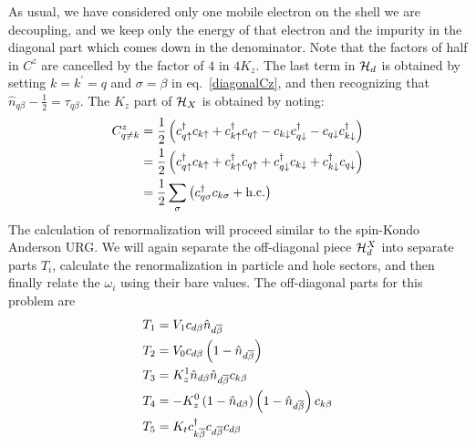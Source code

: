 \documentclass[12pt,twoside]{report}
\numberwithin{equation}{section}
\begin{document}
As usual, we have considered only one mobile electron on the shell we are decoupling, and we keep only the energy of that electron and the impurity in the diagonal part which comes down in the denominator.
Note that the factors of half in \(C^z\) are cancelled by the factor of \(4\) in \(4K_z\).
The last term in \(\mathcal{H}_d\) is obtained by setting \(k=k^\prime=q\) and \(\sigma=\beta\) in eq.~\ref{diagonalCz}, and then recognizing that \(\hat n_{q\beta} - \frac{1}{2} = \tau_{q\beta}\).
The \(K_z\) part of \(\mathcal{H}_X\) is obtained by noting:
\begin{equation}\begin{aligned}
	C^z_{q\neq k} &= \frac{1}{2}\left({c^\dagger_{q\uparrow}c_{k \uparrow} + c^\dagger_{k\uparrow}c_{q \uparrow} - c_{k\downarrow}c^\dagger_{q \downarrow} - c_{q\downarrow}c^\dagger_{k\downarrow}}\right) \\
	&= \frac{1}{2}\left({c^\dagger_{q\uparrow}c_{k \uparrow} + c^\dagger_{k\uparrow}c_{q \uparrow} + c^\dagger_{q \downarrow}c_{k\downarrow} + c^\dagger_{k\downarrow}c_{q\downarrow}}\right)\\
	&= \frac{1}{2}\sum_{\sigma}\left(c^\dagger_{q\sigma}c_{k\sigma} + \text{h.c.}\right)
\end{aligned}\end{equation}
The calculation of renormalization will proceed similar to the spin-Kondo Anderson URG.
We will again separate the off-diagonal piece \(\mathcal{H}_d^X\) into separate parts \(T_i\), calculate the renormalization in particle and hole sectors, and then finally relate the \(\omega_i\) using their bare values.
The off-diagonal parts for this problem are
\begin{equation}\begin{aligned}
	T_1 &= V_1 c_{d\beta}\hat n_{d\overline\beta}\\
	T_2 &= V_0 c_{d\beta}\left(1 - \hat n_{d\overline\beta}\right)\\
	T_3 &= K_z^1 \hat n_{d\beta}\hat n_{d\overline\beta}c_{k\beta}\\
	T_4 &= -K_z^0 \left(1 - \hat n_{d\beta}\right)\left(1 - \hat n_{d\overline\beta}\right)c_{k\beta}\\
	T_5 &= K_t c^\dagger_{k\overline\beta}c_{d\overline\beta}c_{d\beta}\\
\end{aligned}\end{equation}
\end{document}
